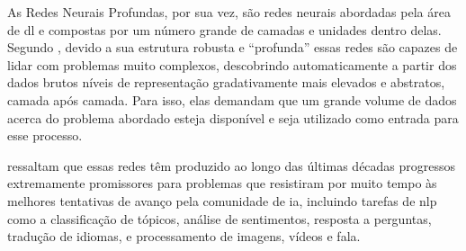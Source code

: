 

As Redes Neurais Profundas, por sua vez, são redes neurais abordadas pela área de \acrfull{dl} e compostas por um número grande de camadas e unidades dentro delas.
Segundo , devido a sua estrutura robusta e ``profunda'' essas redes são capazes de lidar com problemas muito complexos, descobrindo automaticamente a partir dos dados brutos níveis de representação gradativamente mais elevados e abstratos, camada após camada.
Para isso, elas demandam que um grande volume de dados acerca do problema abordado esteja disponível e seja utilizado como entrada para esse processo.

 ressaltam que essas redes têm produzido ao longo das últimas décadas progressos extremamente promissores para problemas que resistiram por muito tempo às melhores tentativas de avanço pela comunidade de \acrshort{ia}, incluindo tarefas de \acrfull{nlp} como a classificação de tópicos, análise de sentimentos, resposta a perguntas, tradução de idiomas, e processamento de imagens, vídeos e fala.






